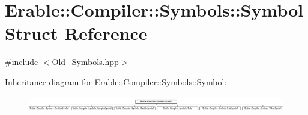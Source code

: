 \hypertarget{class_erable_1_1_compiler_1_1_symbols_1_1_symbol}{}\section{Erable\+::Compiler\+::Symbols\+::Symbol Struct Reference}
\label{class_erable_1_1_compiler_1_1_symbols_1_1_symbol}


{\ttfamily \#include $<$Old\+\_\+\+Symbols.\+hpp$>$}

Inheritance diagram for Erable\+::Compiler\+::Symbols\+::Symbol\+:\begin{figure}[H]
\begin{center}
\leavevmode
\includegraphics[height=0.712468cm]{class_erable_1_1_compiler_1_1_symbols_1_1_symbol}
\end{center}
\end{figure}
